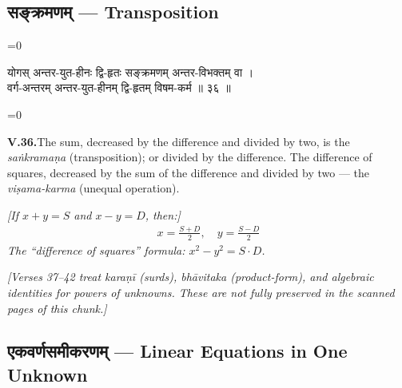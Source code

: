 \documentclass[11pt,a4paper]{article}
\newcommand{\cnote}[1]{\textcolor{notecolor}{\textit{#1}}}
\newcommand{\dev}[1]{{\devanagarifont\color{sktcolor}#1}}
\newcommand{\iast}[1]{\textit{#1}}
\newenvironment{paracol}[1]{\begingroup}{\endgroup}
\newcommand{\switchcolumn}[1][]{%
  \ifnum#1=0\relax\else\par\nobreak\vspace{0.5em}\par\nobreak\fi%
}
\begin{document}
\newpage

\subsection*{\dev{सङ्क्रमणम् — Transposition}}

\vspace{0.3cm}

\begin{paracol}{2}
\switchcolumn[0]
\dev{%
योगस् अन्तर-युत-हीनः द्वि-हृतः सङ्क्रमणम् अन्तर-विभक्तम् वा ।\\
वर्ग-अन्तरम् अन्तर-युत-हीनम् द्वि-हृतम् विषम-कर्म ॥ ३६ ॥
}

\switchcolumn[1]
\textbf{V.36.}\quad The sum, decreased by the difference and divided
by two, is the \iast{saṅkramaṇa} (transposition); or divided by the
difference. The difference of squares, decreased by the sum of the
difference and divided by two — the \iast{viṣama-karma}
(unequal operation).

\medskip
\textit{[If $x + y = S$ and $x - y = D$, then:]}
\begin{align*}
x = \frac{S + D}{2},\quad y = \frac{S - D}{2}
\end{align*}
\textit{The ``difference of squares'' formula: $x^2 - y^2 = S \cdot D$.}
\end{paracol}

\vspace{0.5cm}
\cnote{[Verses 37–42 treat \iast{karaṇī} (surds), \iast{bhāvitaka}
(product-form), and algebraic identities for powers of unknowns.
These are not fully preserved in the scanned pages of this chunk.]}

\newpage

\subsection*{\dev{एकवर्णसमीकरणम् — Linear Equations in One Unknown}}

\vspace{0.3cm}
\end{document}
